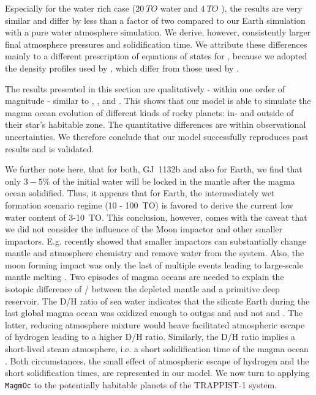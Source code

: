\documentclass[paper=letterpaper,fontsize=12pt,oneside,twocolumn]{article}
\newcommand{\magmoc}{\texttt{\footnotesize{MagmOc}}}
\begin{document}
Especially for the water rich case ($\SI{20}{TO}$ water and $\SI{4}{TO}$ ), the results are very similar and differ by less than a factor of two compared to our Earth simulation with a pure water atmosphere simulation. We derive, however, consistently larger final atmosphere pressures and solidification time. We attribute these differences mainly to a different prescription of equations of states for , because we adopted the density profiles used by \citet{Schaefer2016}, which differ from those used by \citet{Elkins-Tanton2008}.

The results presented in this section are qualitatively - within one order of magnitude - similar to \cite{Schaefer2016}, \cite{Elkins-Tanton2008}, and \citet{Hamano2013}.
This shows that our model is able to simulate the magma ocean evolution of different kinds of rocky planets: in- and outside of their star's habitable zone.
The quantitative differences are within observational uncertainties. We therefore conclude that our model successfully reproduces past results and is validated. 

We further note here, that for both, GJ~1132b and also for Earth, we find that only $3-5\%$ of the initial water will be locked in the mantle after the magma ocean solidified. Thus, it appears that for Earth, the intermediately wet formation scenario regime (10 - \SI{100}{TO}) is favored to derive the current low water content of 3-\SI{10}{TO}. This conclusion, however, comes with the caveat that we did not consider the influence of the Moon impactor and other smaller impactors. E.g. \citet{zahnle2019} recently showed that smaller impactors can substantially change mantle and atmosphere chemistry and remove water from the system.
Also, the moon forming impact was only the last of multiple events leading to large-scale mantle melting \citep{Jacobson2014,Bottke2015}.
Two episodes of magma oceans are needed to explain the isotopic difference of / between the depleted mantle and a primitive deep reservoir.
The D/H ratio of sea water indicates that the silicate Earth during the last global magma ocean was oxidized enough to outgas  and  and not  and  \citep{Pahlevan2019}.
The latter, reducing atmosphere mixture would heave facilitated atmospheric escape of hydrogen leading to a higher D/H ratio.
Similarly, the D/H ratio implies a short-lived steam atmosphere, i.e. a short solidification time of the magma ocean \citep{Stueken2020}.
Both circumstances, the small effect of atmospheric escape of hydrogen and the short solidification times, are represented in our model.
We now turn to applying \magmoc{} to the potentially habitable planets of the TRAPPIST-1 system. 
\end{document}
